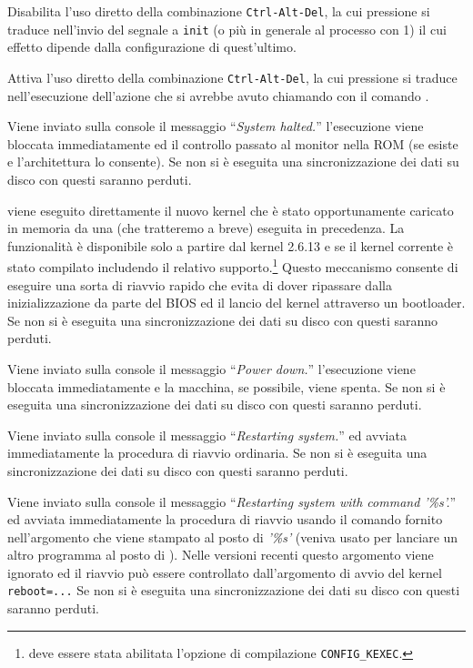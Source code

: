 \begin{basedescript}{\desclabelstyle{\nextlinelabel}}
\item[\constd{LINUX\_REBOOT\_CMD\_CAD\_OFF}] Disabilita l'uso diretto della
  combinazione \texttt{Ctrl-Alt-Del}, la cui pressione si traduce nell'invio
  del segnale  a \texttt{init} (o più in generale al processo
  con  1) il cui effetto dipende dalla configurazione di
  quest'ultimo.
\item[\constd{LINUX\_REBOOT\_CMD\_CAD\_ON}] Attiva l'uso diretto della
  combinazione \texttt{Ctrl-Alt-Del}, la cui pressione si traduce
  nell'esecuzione dell'azione che si avrebbe avuto chiamando  con
  il comando .
\item[\constd{LINUX\_REBOOT\_CMD\_HALT}] Viene inviato sulla console il
  messaggio ``\textit{System halted.}'' l'esecuzione viene bloccata
  immediatamente ed il controllo passato al monitor nella ROM (se esiste e
  l'architettura lo consente). Se non si è eseguita una sincronizzazione dei
  dati su disco con  questi saranno perduti.
\item[\constd{LINUX\_REBOOT\_CMD\_KEXEC}] viene eseguito direttamente il nuovo
  kernel che è stato opportunamente caricato in memoria da una
   (che tratteremo a breve) eseguita in precedenza. La
  funzionalità è disponibile solo a partire dal kernel 2.6.13 e se il kernel
  corrente è stato compilato includendo il relativo supporto.\footnote{deve
    essere stata abilitata l'opzione di compilazione \texttt{CONFIG\_KEXEC}.}
  Questo meccanismo consente di eseguire una sorta di riavvio rapido che evita
  di dover ripassare dalla inizializzazione da parte del BIOS ed il lancio del
  kernel attraverso un bootloader. Se non si è eseguita una sincronizzazione
  dei dati su disco con  questi saranno perduti.
\item[\constd{LINUX\_REBOOT\_CMD\_POWER\_OFF}] Viene inviato sulla console il
  messaggio ``\textit{Power down.}'' l'esecuzione viene bloccata
  immediatamente e la macchina, se possibile, viene spenta.  Se non si è
  eseguita una sincronizzazione dei dati su disco con  questi
  saranno perduti.
\item[\constd{LINUX\_REBOOT\_CMD\_RESTART}] Viene inviato sulla console il
  messaggio ``\textit{Restarting system.}'' ed avviata immediatamente la
  procedura di riavvio ordinaria. Se non si è eseguita una sincronizzazione
  dei dati su disco con  questi saranno perduti.
\item[\constd{LINUX\_REBOOT\_CMD\_RESTART2}] Viene inviato sulla console il
  messaggio ``\textit{Restarting system with command '\%s'.}'' ed avviata
  immediatamente la procedura di riavvio usando il comando fornito
  nell'argomento  che viene stampato al posto di \textit{'\%s'}
  (veniva usato per lanciare un altro programma al posto di ). Nelle
  versioni recenti questo argomento viene ignorato ed il riavvio può essere
  controllato dall'argomento di avvio del kernel \texttt{reboot=...}  Se non
  si è eseguita una sincronizzazione dei dati su disco con  questi
  saranno perduti.
\end{basedescript}


